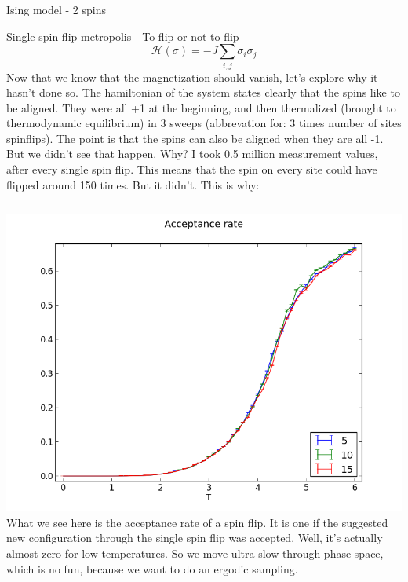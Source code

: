 \documentclass[]{beamer}
\begin{document}
\begin{frame}{Ising model - 2 spins}
\end{frame}

\begin{frame}{Single spin flip metropolis - To flip or not to flip}
\pause
\[ \mathscr{H}(\sigma) = -J \sum\limits_{i, j} \sigma_i \sigma_j \]
 {Now that we know that the magnetization should vanish, let's explore why it hasn't done so.}
 {The hamiltonian of the system states clearly that the spins like to be aligned. They were all +1 at the beginning, and then thermalized (brought to thermodynamic equilibrium) in 3 sweeps (abbrevation for: 3 times number of sites spinflips).}
 {The point is that the spins can also be aligned when they are all -1. But we didn't see that happen. Why?}
 {I took 0.5 million measurement values, after every single spin flip. This means that the spin on every site could have flipped around 150 times. But it didn't. This is why:}
\pause
\begin{columns}[c]
		\includegraphics[width=\textwidth]{img/single_acceptanceRate.png}
		 {What we see here is the acceptance rate of a spin flip. It is one if the suggested new configuration through the single spin flip was accepted. Well, it's actually almost zero for low temperatures. So we move ultra slow through phase space, which is no fun, because we want to do an ergodic sampling.}

\end{columns}
\end{frame}
\end{document}
